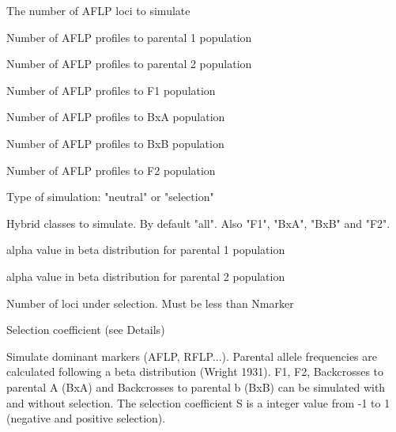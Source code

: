 \documentclass[letterpaper]{book}
\begin{document}
\begin{Arguments}
\begin{ldescription}
\item[\code{Nmarker}] 
The number of AFLP loci to simulate

\item[\code{Na}] 
Number of AFLP profiles to parental 1 population

\item[\code{Nb}] 
Number of AFLP profiles to parental 2 population

\item[\code{Nf1}] 
Number of AFLP profiles to F1 population

\item[\code{Nbxa}] 
Number of AFLP profiles to BxA population

\item[\code{Nbxb}] 
Number of AFLP profiles to BxB population

\item[\code{Nf2}] 
Number of AFLP profiles to F2 population

\item[\code{type}] 
Type of simulation: "neutral" or "selection"

\item[\code{hybrid}] 
Hybrid classes to simulate. By default "all". Also "F1", "BxA", "BxB" and "F2".


\item[\code{apa}] 
alpha value in beta distribution for parental 1 population

\item[\code{apb}] 
alpha value in beta distribution for parental 2 population

\item[\code{Nsel}] 
Number of loci under selection. Must be less than Nmarker

\item[\code{S}] 
Selection coefficient (see Details)


\end{ldescription}
\end{Arguments}
%
\begin{Details}\relax
Simulate dominant markers (AFLP, RFLP...). Parental allele frequencies are calculated following a beta distribution (Wright 1931).
F1, F2, Backcrosses to parental A (BxA) and Backcrosses to parental b (BxB) can be simulated with and without selection. The selection coefficient S is a integer value from -1 to 1 (negative and positive selection).  
\end{Details}
\end{document}

